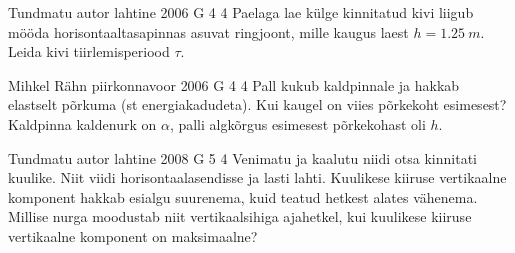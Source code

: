 \documentclass[11pt, twoside]{article}
\begin{document}
{%
{Tundmatu autor} %
{lahtine} %
{2006} %
{G 4} %
{4} %
{
\ifStatement
Paelaga lae külge kinnitatud kivi liigub mööda horisontaaltasapinnas asuvat ringjoont, mille kaugus laest $h = \SI{1,25}{m}$. Leida kivi tiirlemisperiood $\tau$. 
\fi
}

{Mihkel Rähn} %
{piirkonnavoor} %
{2006} %
{G 4} %
{4} %
{
\ifStatement
Pall kukub kaldpinnale ja hakkab elastselt põrkuma (st energiakadudeta). Kui kaugel on viies põrkekoht esimesest? Kaldpinna kaldenurk on $\alpha$, palli algkõrgus esimesest põrkekohast oli $h$.
\fi
}

{Tundmatu autor} %
{lahtine} %
{2008} %
{G 5} %
{4} %
{
\ifStatement
Venimatu ja kaalutu niidi otsa kinnitati kuulike.
Niit viidi horisontaalasendisse ja lasti lahti. Kuulikese kiiruse vertikaalne komponent
hakkab esialgu suurenema, kuid teatud hetkest alates vähenema. Millise nurga moodustab niit vertikaalsihiga ajahetkel, kui kuulikese kiiruse vertikaalne komponent on
maksimaalne?
\fi
}

}
\end{document}
